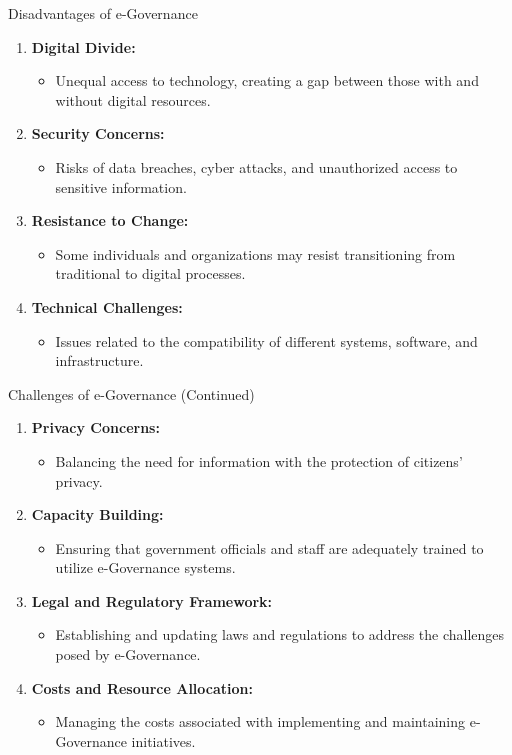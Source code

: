 \begin{frame}{Disadvantages of e-Governance}
  \begin{enumerate}
    \item \textbf{Digital Divide:}
      \begin{itemize}
        \item Unequal access to technology, creating a gap between those with and without digital resources.
      \end{itemize}
    \item \textbf{Security Concerns:}
      \begin{itemize}
        \item Risks of data breaches, cyber attacks, and unauthorized access to sensitive information.
      \end{itemize}
    \item \textbf{Resistance to Change:}
      \begin{itemize}
        \item Some individuals and organizations may resist transitioning from traditional to digital processes.
      \end{itemize}
    \item \textbf{Technical Challenges:}
      \begin{itemize}
        \item Issues related to the compatibility of different systems, software, and infrastructure.
      \end{itemize}
  \end{enumerate}
\end{frame}

\begin{frame}{Challenges of e-Governance (Continued)}
  \begin{enumerate}
    \item \textbf{Privacy Concerns:}
      \begin{itemize}
        \item Balancing the need for information with the protection of citizens' privacy.
      \end{itemize}
    \item \textbf{Capacity Building:}
      \begin{itemize}
        \item Ensuring that government officials and staff are adequately trained to utilize e-Governance systems.
      \end{itemize}
    \item \textbf{Legal and Regulatory Framework:}
      \begin{itemize}
        \item Establishing and updating laws and regulations to address the challenges posed by e-Governance.
      \end{itemize}
    \item \textbf{Costs and Resource Allocation:}
      \begin{itemize}
        \item Managing the costs associated with implementing and maintaining e-Governance initiatives.
      \end{itemize}
  \end{enumerate}
\end{frame}

